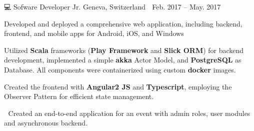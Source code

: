 \documentclass[11pt, a4paper]{awesome-cv}
\begin{document}
{\begin{cventries}
		{💻 Sofware Developer Jr.} %
		{Geneva, Switzerland 📍} %
		{Feb. 2017 – May. 2017 📆} %
		{\begin{cvitems}
				\item {Developed and deployed a comprehensive web application, including backend,
				            frontend, and mobile apps for Android, iOS, and Windows}
				\item {Utilized \textbf{Scala} frameworks (\textbf{Play\! Framework} and
				            \textbf{Slick ORM}) for backend development, implemented a simple \textbf{akka}
				            Actor Model, and \textbf{PostgreSQL} as Database. All components were containerized
				            using custom \textbf{docker} images.}
				\item {Created the frontend with \textbf{Angular2 JS} and \textbf{Typescript},
				            employing the Observer Pattern for efficient state management.}
				\\
				\newline
				\item {🎯 Created an end-to-end application for an event with admin roles, user
				            modules and asynchronous backend.}
			\end{cvitems}
		}

	\end{cventries}
}

\vspace{-4mm}


\vspace{-4mm}
\end{document}
